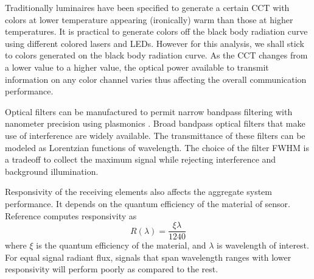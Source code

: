 Traditionally luminaires have been specified to generate a certain CCT with colors at lower temperature appearing (ironically) warm than those at higher temperatures. It is practical to generate colors off the black body radiation curve using different colored lasers and LEDs. However for this analysis, we shall stick to colors generated on the black body radiation curve. As the CCT changes from a lower value to a higher value, the optical power available to transmit information on any color channel varies thus affecting the overall communication performance.

Optical filters can be manufactured to permit narrow bandpass filtering with nanometer precision using plasmonics \cite{xu10a,che12a,yok12a}. Broad bandpass optical filters that make use of interference are widely available. The transmittance of these filters can be modeled as Lorentzian functions of wavelength. The choice of the filter FWHM is a tradeoff to collect the maximum signal while rejecting interference and background illumination.

Responsivity of the receiving elements also affects the aggregate system performance. It depends on the quantum efficiency of the material of sensor. Reference \cite{gha12a} computes responsivity as
\begin{equation}
\label{eqResponsivity}
	 R(\lambda) = \frac{\xi\lambda}{1240}
\end{equation}
where $\xi$ is the quantum efficiency of the material, and $\lambda$ is wavelength of interest. For equal signal radiant flux, signals that span wavelength ranges with lower responsivity will perform poorly as compared to the rest. 
